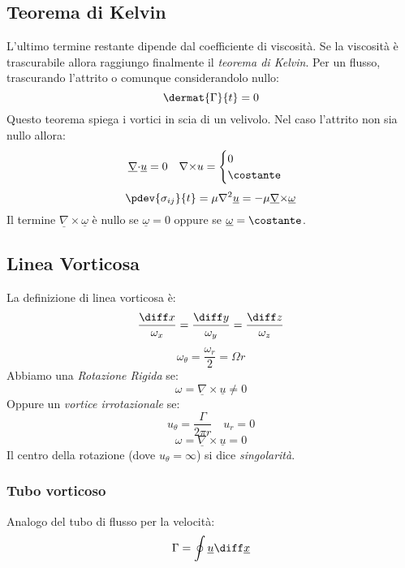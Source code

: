 \subsection{Teorema di Kelvin}
L'ultimo termine restante dipende dal coefficiente di viscosità.
Se la viscosità è trascurabile allora raggiungo finalmente il \emph{teorema di Kelvin}.
Per un flusso, trascurando l'attrito o comunque considerandolo nullo:
\begin{equation}
	\label{eq:teo_kelvin}
	\dermat{{\Gamma}}{t} = 0
\end{equation}
Questo teorema spiega i vortici in scia di un velivolo. 
Nel caso l'attrito non sia nullo allora:
\[
	\underline{\nabla}{\cdot}\underline{u} = 0 \quad {\nabla}{\times}u = 
	\begin{cases}
	  0\\
		\costante
	\end{cases}
\]
\[
  \pdev{\sigma_{ij}}{t} = {\mu} {\nabla}^2 \underline{u}= -{\mu}\underline{\nabla}{\times}\underline{{\omega}}
\]
Il termine $ \underline{\nabla}{\times}\underline{{\omega}} $ è nullo se $ \underline{{\omega}} = 0 $ oppure se $ \underline{{\omega}} = \costante $.

\subsection{Linea Vorticosa}
La definizione di linea vorticosa è:
\[
  \frac{\diff x}{{\omega}_{x}} = \frac{\diff y}{{\omega}_{y}} = \frac{\diff z}{{\omega}_{z}}
\]
\[
  {\omega}_{{\theta}} = \frac{{\omega}_{r}}{2} = {\Omega} r
\]
Abbiamo una \emph{Rotazione Rigida} se:
\[
  {\omega} = \underline{\nabla}{\times}\underline{u} \neq0
\]
Oppure un \emph{vortice irrotazionale} se:
\[
  u _{{\theta}} = \frac{{\Gamma}}{2 {\pi}r} \quad u_r=0
\]
\[
  {\omega} = \underline{\nabla}{\times}\underline{u}=0
\]
Il centro della rotazione (dove $ u_{{\theta}}= \infty $) si dice \emph{singolarità}.
\subsubsection{Tubo vorticoso}
Analogo del tubo di flusso per la velocità:
\[
  {\Gamma}= \oint \underline{u}\space \diff \underline{x}
\]
